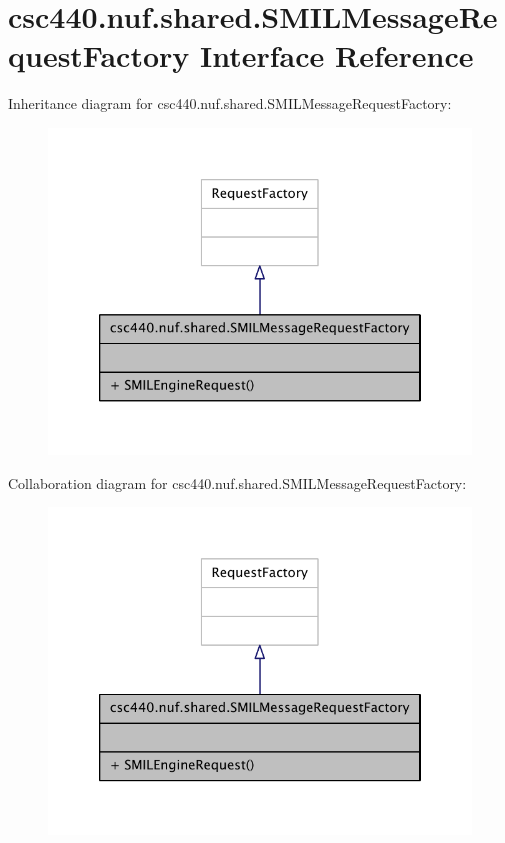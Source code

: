 \hypertarget{interfacecsc440_1_1nuf_1_1shared_1_1_s_m_i_l_message_request_factory}{\section{csc440.\-nuf.\-shared.\-S\-M\-I\-L\-Message\-Request\-Factory Interface Reference}
\label{interfacecsc440_1_1nuf_1_1shared_1_1_s_m_i_l_message_request_factory}
}


Inheritance diagram for csc440.\-nuf.\-shared.\-S\-M\-I\-L\-Message\-Request\-Factory\-:
\nopagebreak
\begin{figure}[H]
\begin{center}
\leavevmode
\includegraphics[width=326pt]{interfacecsc440_1_1nuf_1_1shared_1_1_s_m_i_l_message_request_factory__inherit__graph}
\end{center}
\end{figure}


Collaboration diagram for csc440.\-nuf.\-shared.\-S\-M\-I\-L\-Message\-Request\-Factory\-:
\nopagebreak
\begin{figure}[H]
\begin{center}
\leavevmode
\includegraphics[width=326pt]{interfacecsc440_1_1nuf_1_1shared_1_1_s_m_i_l_message_request_factory__coll__graph}
\end{center}
\end{figure}
